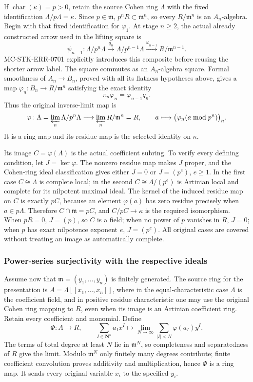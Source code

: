 If \(\operatorname{char}(\kappa)=p>0\), retain the source Cohen ring \(\Lambda\) with the fixed identification \(\Lambda/p\Lambda=\kappa\). Since \(p\in\mathfrak m\), \(p^nR\subset\mathfrak m^n\), so every \(R/\mathfrak m^n\) is an \(A_n\)-algebra. Begin with that fixed identification for \(\varphi_1\). At stage \(n\geq2\), the actual already constructed arrow used in the lifting square is \[
 \psi_{n-1}:
 \Lambda/p^n\Lambda
 \xrightarrow{q_n}\Lambda/p^{n-1}\Lambda
 \xrightarrow{\varphi_{n-1}}R/\mathfrak m^{n-1}.
\] MC-STK-ERR-0701 explicitly introduces this composite before reusing the shorter arrow label. The square commutes as an \(A_n\)-algebra square. Formal smoothness of \(A_n\to B_n\), proved with all its flatness hypotheses above, gives a map \(\varphi_n:B_n\to R/\mathfrak m^n\) satisfying the exact identity \[
 \pi_n\varphi_n=\varphi_{n-1}q_n.
\] Thus the original inverse-limit map is \[
 \varphi:\Lambda=\varprojlim_n\Lambda/p^n\Lambda
       \longrightarrow\varprojlim_n R/\mathfrak m^n=R,\qquad
 a\longmapsto\bigl(\varphi_n(a\bmod p^n)\bigr)_n.
\] It is a ring map and its residue map is the selected identity on \(\kappa\).

Its image \(C=\varphi(\Lambda)\) is the actual coefficient subring. To verify every defining condition, let \(J=\ker\varphi\). The nonzero residue map makes \(J\) proper, and the Cohen-ring ideal classification gives either \(J=0\) or \(J=(p^e)\), \(e\geq1\). In the first case \(C\cong\Lambda\) is complete local; in the second \(C\cong\Lambda/(p^e)\) is Artinian local and complete for its nilpotent maximal ideal. The kernel of the induced residue map on \(C\) is exactly \(pC\), because an element \(\varphi(a)\) has zero residue precisely when \(a\in p\Lambda\). Therefore \(C\cap\mathfrak m=pC\), and \(C/pC\to\kappa\) is the required isomorphism. When \(pR=0\), \(J=(p)\), so \(C\) is a field; when no power of \(p\) vanishes in \(R\), \(J=0\); when \(p\) has exact nilpotence exponent \(e\), \(J=(p^e)\). All original cases are covered without treating an image as automatically complete.

\subsubsection{Power-series surjectivity with the respective ideals}\label{power-series-surjectivity-with-the-respective-ideals}

Assume now that \(\mathfrak m=(y_1,\ldots,y_n)\) is finitely generated. The source ring for the presentation is \(A=\Lambda[[x_1,\ldots,x_n]]\), where in the equal-characteristic case \(\Lambda\) is the coefficient field, and in positive residue characteristic one may use the original Cohen ring mapping to \(R\), even when its image is an Artinian coefficient ring. Retain every coefficient and monomial. Define \[
 \Phi:A\longrightarrow R,\qquad
 \sum_{I\in\mathbf N^n}a_Ix^I
 \longmapsto
 \lim_{N\to\infty}\sum_{|I|<N}\varphi(a_I)y^I.
\] The terms of total degree at least \(N\) lie in \(\mathfrak m^N\), so completeness and separatedness of \(R\) give the limit. Modulo \(\mathfrak m^N\) only finitely many degrees contribute; finite coefficient convolution proves additivity and multiplication, hence \(\Phi\) is a ring map. It sends every original variable \(x_i\) to the specified \(y_i\).

